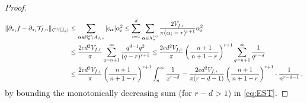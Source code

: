 \documentclass[10pt,a4paper]{amsart}
\DeclarePairedDelimiter{\norm}{\lVert}{\rVert}
\newcommand{\N}{\mathbb{N}}
\begin{document}
\begin{proof}
\begin{align}
    \norm{\partial_{x_i}f-\partial_{x_i}\mathcal{T}_{f,n}}_{C^0(\square_d)}
    &\leq \sum_{\boldsymbol{\alpha} \in \N_0^d \setminus A_{d,n}} |c_{\boldsymbol{\alpha}}|\alpha_i^2  \leq \sum_{i=1}^{d}  \sum_{\boldsymbol{\alpha} \in \Lambda_n^{(i)}}
 \frac{2V_{f,r}}{ \pi (\alpha_i-r)^{r+1}}\alpha_i^2\nonumber \\ 
&\leq \frac{2ed^2V_{f,r}}{\pi}\sum_{q=n+1}^{\infty} \frac{q^{d-1}q^2}{(q-r)^{r+1}} \leq \frac{2ed^2V_{f,r}}{\pi}\left(\frac{n+1}{\,n+1-r\,}\right)^{r+1} \sum_{q=n+1}^{\infty} \frac{1}{q^{r-d}}\nonumber\\
&\leq \frac{2ed^2V_{f,r}}{\pi}\left(\frac{n+1}{\,n+1-r\,}\right)^{r+1}\int_{n}^{\infty}\frac{1}{x^{r-d}}=\frac{2ed^2V_{f,r}}{\pi(r-d-1)}\left(\frac{n+1}{\,n+1-r\,}\right)^{r+1}\cdot\frac{1}{n^{r-d-1}} \,,\label{eq:EST}
\end{align}
by bounding the monotonically decreasing sum (for  \(r-d >1\))  in \eqref{eq:EST}.
\end{proof}
\end{document}
